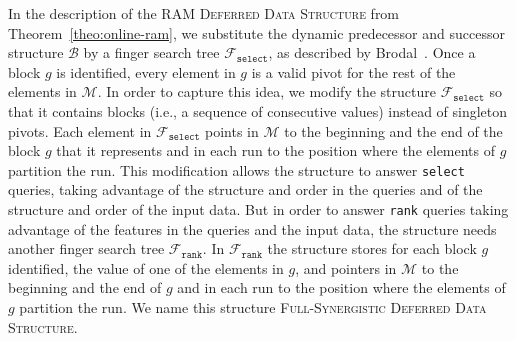 In the description of the \textsc{RAM Deferred Data Structure} from
Theorem~\ref{theo:online-ram}, we substitute the dynamic predecessor
and successor structure $\mathcal{B}$ by a finger search tree
$\mathcal{F}_{\texttt{select}}$, as described by
Brodal~\cite{1998-SODA-FingerSearchTreesWithConstantInsertionTime-Brodal}. Once
a block $g$ is identified, every element in $g$ is a valid pivot for
the rest of the elements in $\mathcal{M}$. In order to capture this
idea, we modify the structure $\mathcal{F}_{\texttt{select}}$ so that
it contains blocks (i.e., a sequence of consecutive values) instead of
singleton pivots. Each element in $\mathcal{F}_{\texttt{select}}$
points in $\mathcal{M}$ to the beginning and the end of the block $g$
that it represents and in each run to the position where the elements
of $g$ partition the run. This modification allows the structure to
answer \texttt{select} queries, taking advantage of the structure and
order in the queries and of the structure and order of the input
data. But in order to answer \texttt{rank} queries taking advantage of
the features in the queries and the input data, the structure needs
another finger search tree $\mathcal{F}_{\texttt{rank}}$. In
$\mathcal{F}_{\texttt{rank}}$ the structure stores for each block $g$
identified, the value of one of the elements in $g$, and pointers in
$\mathcal{M}$ to the beginning and the end of $g$ and in each run to
the position where the elements of $g$ partition the run. We name this
structure \textsc{Full-Synergistic Deferred Data Structure}.

